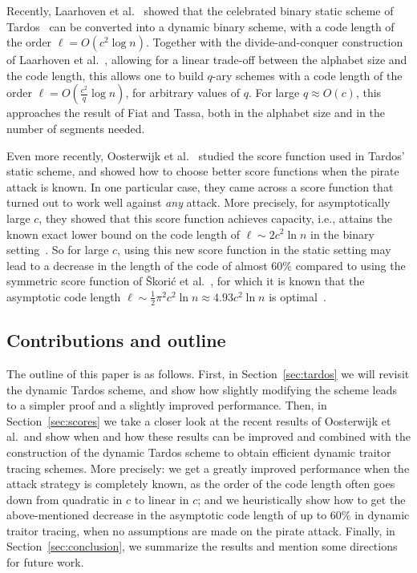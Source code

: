 \documentclass[10pt,a4paper,twocolumn]{article}
\begin{document}
Recently, Laarhoven et al.~\cite{laarhoven13tit} showed that the celebrated binary static scheme of Tardos~\cite{tardos03} can be converted into a dynamic binary scheme, with a code length of the order $\ell = O(c^2 \log n)$. Together with the divide-and-conquer construction of Laarhoven et al.~\cite{laarhoven12wifs}, allowing for a linear trade-off between the alphabet size and the code length, this allows one to build $q$-ary schemes with a code length of the order $\ell = O(\frac{c^2}{q} \log n)$, for arbitrary values of $q$. For large $q \approx O(c)$, this approaches the result of Fiat and Tassa, both in the alphabet size and in the number of segments needed.

Even more recently, Oosterwijk et al.~\cite{oosterwijk13} studied the score function used in Tardos' static scheme, and showed how to choose better score functions when the pirate attack is known. In one particular case, they came across a score function that turned out to work well against \textit{any} attack. More precisely, for asymptotically large $c$, they showed that this score function achieves capacity, i.e., attains the known exact lower bound on the code length of $\ell \sim 2 c^2 \ln n$ in the binary setting~\cite{huang12}. So for large $c$, using this new score function in the static setting may lead to a decrease in the length of the code of almost $60\%$ compared to using the symmetric score function of \v{S}kori\'{c} et al.~\cite{skoric08}, for which it is known that the asymptotic code length $\ell \sim \frac{1}{2} \pi^2 c^2 \ln n \approx 4.93 c^2 \ln n$ is optimal~\cite{laarhoven13ihmmsec}.

\subsection{Contributions and outline}

The outline of this paper is as follows. First, in Section~\ref{sec:tardos} we will revisit the dynamic Tardos scheme, and show how slightly modifying the scheme leads to a simpler proof and a slightly improved performance. Then, in Section~\ref{sec:scores} we take a closer look at the recent results of Oosterwijk et al.\ and show when and how these results can be improved and combined with the construction of the dynamic Tardos scheme to obtain efficient dynamic traitor tracing schemes. More precisely: we get a greatly improved performance when the attack strategy is completely known, as the order of the code length often goes down from quadratic in $c$ to linear in $c$; and we heuristically show how to get the above-mentioned decrease in the asymptotic code length of up to $60\%$ in dynamic traitor tracing, when no assumptions are made on the pirate attack. Finally, in Section~\ref{sec:conclusion}, we summarize the results and mention some directions for future work. 
\end{document}
